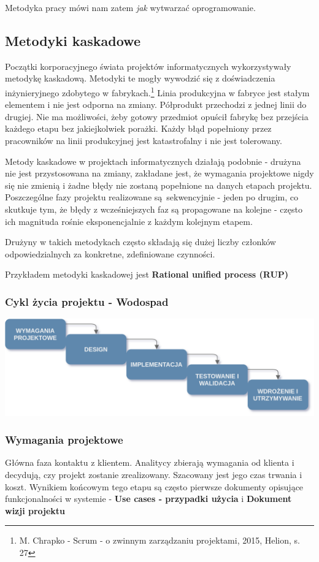 \documentclass{article}
\begin{document}
Metodyka pracy mówi nam zatem \textit{jak} wytwarzać oprogramowanie.

\subsection{Metodyki kaskadowe}
Początki korporacyjnego świata projektów informatycznych wykorzystywały metodykę kaskadową. Metodyki te mogły wywodzić się z doświadczenia inżynieryjnego zdobytego w fabrykach.\footnote{M. Chrapko - Scrum - o zwinnym zarządzaniu projektami, 2015, Helion, s. 27} Linia produkcyjna w fabryce jest
stałym elementem i nie jest odporna na zmiany. Półprodukt przechodzi z jednej linii do drugiej. Nie ma możliwości, żeby gotowy przedmiot opuścił fabrykę bez przejścia każdego etapu bez jakiejkolwiek porażki.
Każdy błąd popełniony przez pracowników na linii produkcyjnej jest katastrofalny i nie jest tolerowany.

Metody kaskadowe w projektach informatycznych działają podobnie - drużyna nie jest przystosowana na zmiany, zakładane jest, że wymagania projektowe nigdy się nie zmienią i żadne błędy nie zostaną popełnione na danych etapach projektu. Poszczególne fazy projektu realizowane są sekwencyjnie - jeden po drugim, co skutkuje tym, że błędy z wcześniejszych faz są propagowane na kolejne - często ich magnituda rośnie eksponencjalnie z każdym kolejnym etapem.

Drużyny w takich metodykach często składają się dużej liczby członków odpowiedzialnych za konkretne, zdefiniowane czynności.

Przykładem metodyki kaskadowej jest \textbf{Rational unified process (RUP)}

\subsubsection{Cykl życia projektu - Wodospad}
\begin{center}
    \includegraphics[scale=0.25]{waterfall_diagram.png}
\end{center}

\subsubsection*{Wymagania projektowe}
Główna faza kontaktu z klientem. Analitycy zbierają wymagania od klienta i decydują, czy projekt zostanie zrealizowany. Szacowany jest jego czas trwania i koszt. Wynikiem końcowym tego etapu są często pierwsze dokumenty opisujące funkcjonalności w systemie - \textbf{Use cases - przypadki użycia} i \textbf{Dokument wizji projektu}
\end{document}
